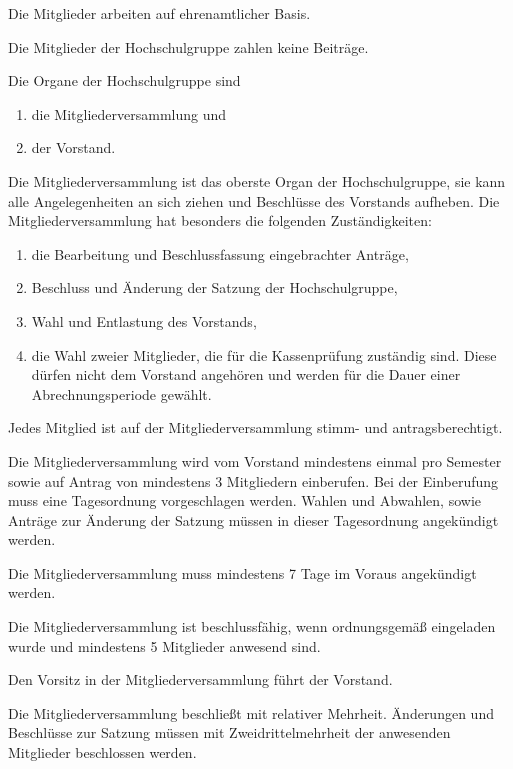 \documentclass[a4paper, parskip=half, numbers=noenddot]{scrartcl}
\begin{document}
\begin{contract}
Die Mitglieder arbeiten auf ehrenamtlicher Basis.

Die Mitglieder der Hochschulgruppe zahlen keine Beiträge.

%
%


Die Organe der Hochschulgruppe sind

  \begin{enumerate}
  \item die Mitgliederversammlung und
  \item der Vorstand.
  \end{enumerate}


%
%

%

Die Mitgliederversammlung ist das oberste Organ der Hochschulgruppe,
sie kann alle Angelegenheiten an sich ziehen und Beschlüsse des Vorstands
aufheben. Die Mitgliederversammlung hat besonders die folgenden Zuständigkeiten:
\begin{enumerate}
  \item die Bearbeitung und Beschlussfassung eingebrachter Anträge,
  \item Beschluss und Änderung der Satzung der Hochschulgruppe,
  \item Wahl und Entlastung des Vorstands,
  \item die Wahl zweier Mitglieder, die für die Kassenprüfung zuständig sind.
    Diese dürfen nicht dem Vorstand angehören und werden für die Dauer einer
    Abrechnungsperiode gewählt.
\end{enumerate}

Jedes Mitglied ist auf der Mitgliederversammlung stimm- und antragsberechtigt.

Die Mitgliederversammlung wird vom Vorstand mindestens einmal pro Semester sowie
auf Antrag von mindestens 3 Mitgliedern einberufen.
Bei der Einberufung muss eine Tagesordnung vorgeschlagen werden.
Wahlen und Abwahlen, sowie Anträge zur Änderung der Satzung müssen in dieser
Tagesordnung angekündigt werden.

Die Mitgliederversammlung muss mindestens 7 Tage im Voraus angekündigt
werden.

Die Mitgliederversammlung ist beschlussfähig, wenn ordnungsgemäß eingeladen
wurde und mindestens 5 Mitglieder anwesend sind.

Den Vorsitz in der Mitgliederversammlung führt der Vorstand.

Die Mitgliederversammlung beschließt mit relativer Mehrheit.
Änderungen und Beschlüsse zur Satzung müssen mit Zweidrittelmehrheit der
anwesenden Mitglieder beschlossen werden.


\end{contract}
\end{document}

